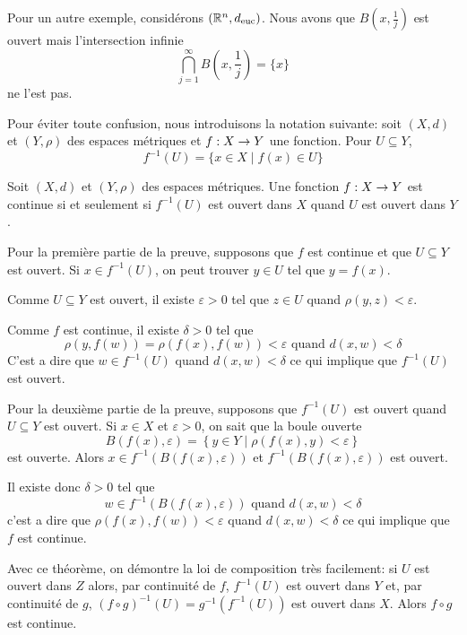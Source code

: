 \documentclass[french]{article}
\begin{document}
\par Pour un autre exemple, considérons $(\mathbb{R}^n, d_\text{euc})$. Nous avons que $B\left(x, \frac{1}{j}\right)$ est ouvert mais l'intersection infinie
$$\bigcap_{j=1}^{\infty} B\left(x, \frac{1}{j}\right) = \{x\}$$
ne l'est pas.
\par Pour éviter toute confusion, nous introduisons la notation suivante: soit $(X, d)$ et $(Y, \rho)$ des espaces métriques et $f: X \rightarrow Y$ une fonction. Pour $U \subseteq Y$,
$$f^{-1}(U) = \{ x \in X \mid f(x) \in U \}$$
\begin{theoreme}
  Soit $(X, d)$ et $(Y, \rho)$ des espaces métriques. Une fonction $f: X \rightarrow Y$ est continue si et seulement si $f^{-1}(U)$ est ouvert dans $X$ quand $U$ est ouvert dans $Y$.

  \tcblower
  \begin{preuve}
    Pour la première partie de la preuve, supposons que $f$ est continue et que $U \subseteq Y$ est ouvert. Si $x \in f^{-1}(U)$, on peut trouver $y \in U$ tel que $y=f(x)$.
    \par Comme  $U \subseteq Y$ est ouvert, il existe $\varepsilon > 0$ tel que $z \in U$ quand $\rho(y, z) < \varepsilon$.
    \par Comme $f$ est continue, il existe $\delta > 0$ tel que
    $$\rho(y, f(w)) = \rho(f(x), f(w)) < \varepsilon \text{ quand } d(x, w) < \delta$$
    C'est a dire que $w \in f^{-1}(U)$ quand $d(x, w) < \delta$ ce qui implique que $f^{-1}(U)$ est ouvert.
    \par Pour la deuxième partie de la preuve, supposons que $f^{-1}(U)$ est ouvert quand $U\subseteq Y$ est ouvert. Si $x \in X$ et $\varepsilon > 0$, on sait que la boule ouverte
    $$B\left(f(x), \varepsilon\right) = \left\{ y \in Y \mid \rho(f(x), y) < \varepsilon \right\}$$
    est ouverte. Alors $x \in f^{-1}\left(B(f(x), \varepsilon)\right)$ et $f^{-1}\left(B(f(x), \varepsilon)\right)$ est ouvert.
    \par Il existe donc $\delta > 0$ tel que 
    $$w \in f^{-1}\left(B(f(x), \varepsilon)\right) \text{ quand } d(x, w) < \delta$$
    c'est a dire que $\rho(f(x), f(w)) < \varepsilon$ quand $d(x, w) < \delta$ ce qui implique que $f$ est continue.
  \end{preuve}
\end{theoreme}
Avec ce théorème, on démontre la loi de composition très facilement: si $U$ est ouvert dans $Z$ alors, par continuité de $f$, $f^{-1}(U)$ est ouvert dans $Y$ et, par continuité de $g$, $(f \circ g)^{-1}(U) = g^{-1}\left(f^{-1}(U)\right)$ est ouvert dans $X$. Alors $f \circ g$ est continue.
\end{document}
